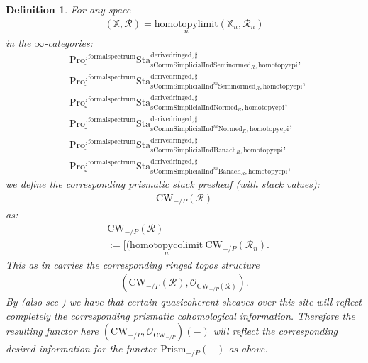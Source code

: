 \documentclass[12pt]{book}
\newtheorem{definition}{Definition}
\begin{document}
\begin{definition}
For any space
\begin{align}
(\mathbb{X},\mathcal{R})=\underset{n}{\mathrm{homotopylimit}}(\mathbb{X}_n,\mathcal{R}_n)	
\end{align}
in the $\infty$-categories:
\begin{align}
&\mathrm{Proj}^\mathrm{formalspectrum}\mathrm{Sta}^\mathrm{derivedringed,\sharp}_{\mathrm{sComm}\mathrm{Simplicial}\mathrm{Ind}\mathrm{Seminormed}_R,\mathrm{homotopyepi}},\\
&\mathrm{Proj}^\mathrm{formalspectrum}\mathrm{Sta}^\mathrm{derivedringed,\sharp}_{\mathrm{sComm}\mathrm{Simplicial}\mathrm{Ind}^m\mathrm{Seminormed}_R,\mathrm{homotopyepi}},\\
&\mathrm{Proj}^\mathrm{formalspectrum}\mathrm{Sta}^\mathrm{derivedringed,\sharp}_{\mathrm{sComm}\mathrm{Simplicial}\mathrm{Ind}\mathrm{Normed}_R,\mathrm{homotopyepi}},\\
&\mathrm{Proj}^\mathrm{formalspectrum}\mathrm{Sta}^\mathrm{derivedringed,\sharp}_{\mathrm{sComm}\mathrm{Simplicial}\mathrm{Ind}^m\mathrm{Normed}_R,\mathrm{homotopyepi}},\\
&\mathrm{Proj}^\mathrm{formalspectrum}\mathrm{Sta}^\mathrm{derivedringed,\sharp}_{\mathrm{sComm}\mathrm{Simplicial}\mathrm{Ind}\mathrm{Banach}_R,\mathrm{homotopyepi}},\\
&\mathrm{Proj}^\mathrm{formalspectrum}\mathrm{Sta}^\mathrm{derivedringed,\sharp}_{\mathrm{sComm}\mathrm{Simplicial}\mathrm{Ind}^m\mathrm{Banach}_R,\mathrm{homotopyepi}},	
\end{align}
we define the corresponding prismatic stack presheaf (with stack values):
\begin{align}
\mathrm{CW}_{-/P}(\mathcal{R})
\end{align}
as:
\begin{align}
&\mathrm{CW}_{-/P}(\mathcal{R})\\
&:=[(\underset{n}{\mathrm{homotopycolimit}}~ \mathrm{CW}_{-/P}(\mathcal{R}_n).	
\end{align}
This as in \cite[Definition 3.1, Variant 5.1]{BL} carries the corresponding ringed topos structure 
\begin{align}
(\mathrm{CW}_{-/P}(\mathcal{R}),\mathcal{O}_{\mathrm{CW}_{-/P}(\mathcal{R})}). 
\end{align}
By \cite[Proposition 8.15]{BL} (also see \cite{Dr1}) we have that certain quasicoherent sheaves over this site will reflect completely the corresponding prismatic cohomological information. Therefore the resulting functor here $(\mathrm{CW}_{-/P},\mathcal{O}_{\mathrm{CW}_{-/P}})(-)$ will reflect the corresponding desired information for the functor $\mathrm{Prism}_{-/P}(-)$ as above.
\end{definition}
\end{document}
